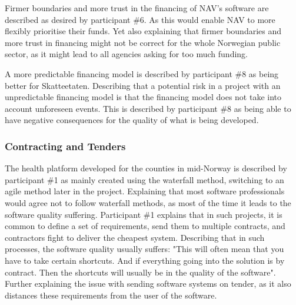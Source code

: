 Firmer boundaries and more trust in the financing of NAV's software are described as desired by participant \#6. As this would enable NAV to more flexibly prioritise their funds. Yet also explaining that firmer boundaries and more trust in financing might not be correct for the whole Norwegian public sector, as it might lead to all agencies asking for too much funding. 


A more predictable financing model is described by participant \#8 as being better for Skatteetaten. Describing that a potential risk in a project with an unpredictable financing model is that the financing model does not take into account unforeseen events. This is described by participant \#8 as being able to have negative consequences for the quality of what is being developed.


\subsubsection{Contracting and Tenders} \label{sec:contracting_and_tenders}
The health platform developed for the counties in mid-Norway is described by participant \#1 as mainly created using the waterfall method, switching to an agile method later in the project. Explaining that most software professionals would agree not to follow waterfall methods, as most of the time it leads to the software quality suffering. Participant \#1 explains that in such projects, it is common to define a set of requirements, send them to multiple contracts, and contractors fight to deliver the cheapest system. Describing that in such processes, the software quality usually suffers: "This will often mean that you have to take certain shortcuts. And if everything going into the solution is by contract. Then the shortcuts will usually be in the quality of the software". Further explaining the issue with sending software systems on tender, as it also distances these requirements from the user of the software.

